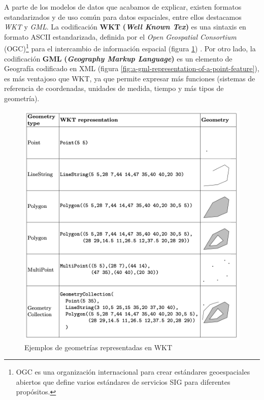 
A parte de los modelos de datos que acabamos de explicar, existen formatos estandarizados y de uso común para datos espaciales, entre ellos destacamos \textit{WKT} y \textit{GML}. La codificación \textbf{WKT} \textbf{(\textit{Well Known Tex})} es una sintaxis en formato ASCII estandarizada, definida por el \textit{Open Geospatial Consortium} (OGC)\footnote{OGC es una organización internacional para crear estándares geoespaciales abiertos que define varios estándares de servicios SIG para diferentes propósitos.} para el intercambio de información espacial (figura \ref{fig:wkt}) \cite{wkt}. Por otro lado, la codificación \textbf{GML} \textbf{(\textit{Geography Markup Language})} es un elemento de Geografía codificado en XML (figura \ref{fig:a-gml-representation-of-a-point-feature}), es más ventajoso que WKT, ya que permite expresar más funciones (sistemas de referencia de coordenadas, unidades de medida, tiempo y más tipos de geometría). 

\begin{figure}[H]
	\centering
	\includegraphics[width=0.9\linewidth]{imagenes/capitulo2/wkt}
	\caption{Ejemplos de geometrías representadas en WKT}
	\label{fig:wkt}
\end{figure}

